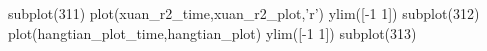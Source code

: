subplot(311)
plot(xuan_r2_time,xuan_r2_plot,'r')
ylim([-1 1])
subplot(312)
plot(hangtian_plot_time,hangtian_plot)
ylim([-1 1])
subplot(313)
